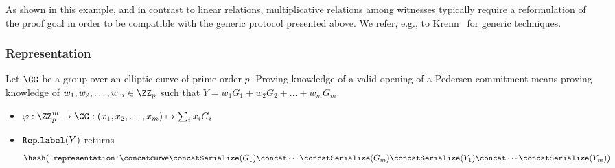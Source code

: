 \documentclass[11pt]{article}
\begin{document}
As shown in this example, and in contrast to linear relations, multiplicative relations among witnesses typically require a reformulation of the proof goal in order to be compatible with the generic protocol presented above.
We refer, e.g., to Krenn~\cite{krenn12} for generic techniques.


\subsubsection{Representation}
Let $\GG$ be a group over an elliptic curve of prime order $p$.
Proving knowledge of a valid opening of a Pedersen commitment means proving knowledge of $w_1,w_2, \dots, w_m\in\ZZ_p$ such that $Y=w_1G_1 + w_2G_2 + \dots + w_m G_m$.


\begin{itemize}
  \item $\varphi:\ZZ_p^m\to\GG:(x_1,x_2, \dots, x_m)\mapsto \sum_i x_iG_i$
  \item $\texttt{Rep}.\texttt{label}(Y)$ returns
  \[
    \hash(\replabel \concat \curvectx \concat \serialize(G_1) \concat \cdots \concat \serialize(G_m) \concat \serialize(Y_1) \concat \cdots \concat \serialize(Y_m))
  \]
\end{itemize}
\end{document}
